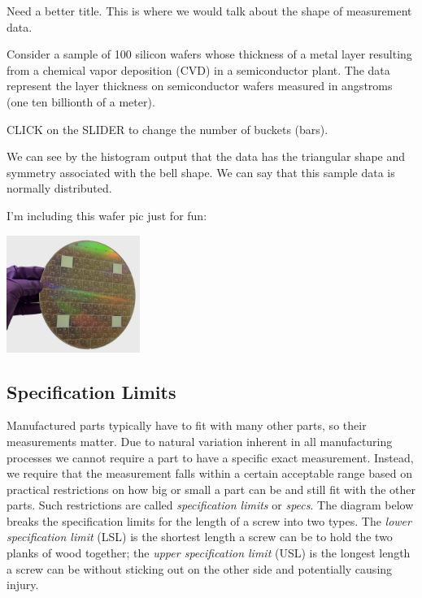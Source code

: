 \documentclass{ximera}
\begin{document}
Need a better title.  This is where we would talk about the shape of measurement data.

\begin{exploration}\label{exp:histogram1}
Consider a sample of 100 silicon wafers whose thickness of a metal layer resulting from a chemical vapor deposition (CVD) in a semiconductor plant. The data represent the layer thickness on semiconductor wafers measured in angstroms (one ten billionth of a meter).


CLICK on the SLIDER to change the number of buckets (bars).

\begin{onlineOnly}
\begin{center} 
\end{center}
\end{onlineOnly}

We can see by the histogram output that the data has the triangular shape and symmetry associated with the bell shape. We can say that this sample data is normally distributed.

I'm including this wafer pic just for fun:

\begin{image}
         \includegraphics[height=1.5in]{200mmWafer.png}
\end{image}
\end{exploration}

\subsection*{Specification Limits}
Manufactured parts typically have to fit with many other parts, so their measurements matter. Due to natural variation inherent in all manufacturing processes we cannot require a part to have a specific exact measurement.  Instead, we require that the measurement falls within a certain acceptable range based on practical restrictions on how big or small a part can be and still fit with the other parts.  Such restrictions are called \emph{specification limits} or \emph{specs}.  The diagram below breaks the specification limits for the length of a screw into two types.  The \emph{lower specification limit} (LSL) is the shortest length a screw can be to hold the two planks of wood together; the \emph{upper specification limit} (USL) is the longest length a screw can be without sticking out on the other side and potentially causing injury.
\end{document}
